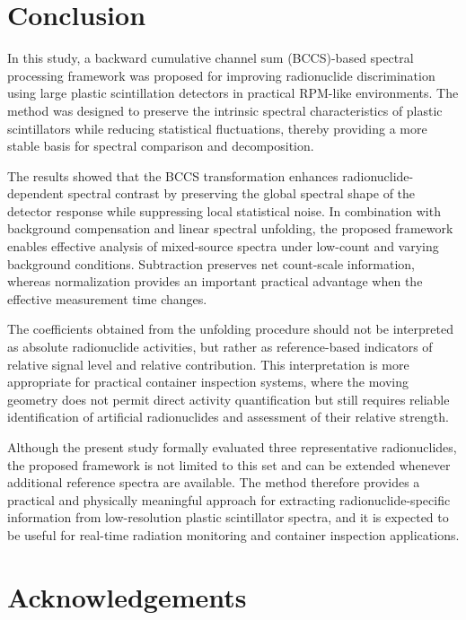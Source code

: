 \documentclass[10pt]{wlscirep}
\begin{document}
\section*{Conclusion}

In this study, a backward cumulative channel sum (BCCS)-based spectral processing framework was proposed for improving radionuclide discrimination using large plastic scintillation detectors in practical RPM-like environments. The method was designed to preserve the intrinsic spectral characteristics of plastic scintillators while reducing statistical fluctuations, thereby providing a more stable basis for spectral comparison and decomposition.

The results showed that the BCCS transformation enhances radionuclide-dependent spectral contrast by preserving the global spectral shape of the detector response while suppressing local statistical noise. In combination with background compensation and linear spectral unfolding, the proposed framework enables effective analysis of mixed-source spectra under low-count and varying background conditions. Subtraction preserves net count-scale information, whereas normalization provides an important practical advantage when the effective measurement time changes.

The coefficients obtained from the unfolding procedure should not be interpreted as absolute radionuclide activities, but rather as reference-based indicators of relative signal level and relative contribution. This interpretation is more appropriate for practical container inspection systems, where the moving geometry does not permit direct activity quantification but still requires reliable identification of artificial radionuclides and assessment of their relative strength. 

Although the present study formally evaluated three representative radionuclides, the proposed framework is not limited to this set and can be extended whenever additional reference spectra are available. The method therefore provides a practical and physically meaningful approach for extracting radionuclide-specific information from low-resolution plastic scintillator spectra, and it is expected to be useful for real-time radiation monitoring and container inspection applications.

\section*{Acknowledgements}
\end{document}
